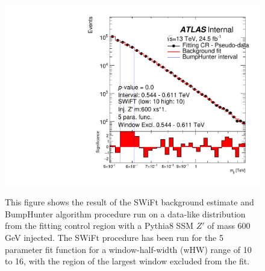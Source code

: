 \begin{figure}[!htb]
{}
 {
  \includegraphics[width=0.45\linewidth, angle=0]{figs/Dibjet/LowMass/FitStudy/bhFit_corrFitCR_dataLike_v13_5para_low10_high10_inj_Zprimebb600_xsFactor1_removedWindow.pdf}
}
\vspace{10pt}
\caption{\label{fig:app-bhFit_lm_corrFitCR_dataLike_inj_Zprimebb600_xsFactor1_removedWindow}
  This figure shows the result of the SWiFt background estimate and {\sc BumpHunter} algorithm procedure run on a data-like distribution
  from the fitting control region with a Pythia8 SSM $Z'$ of mass 600 GeV injected.
  The SWiFt procedure has been run for the 5 parameter fit function for a window-half-width (wHW) range of 10 to 16, with the region of the largest window excluded from the fit.
}
\end{figure}

